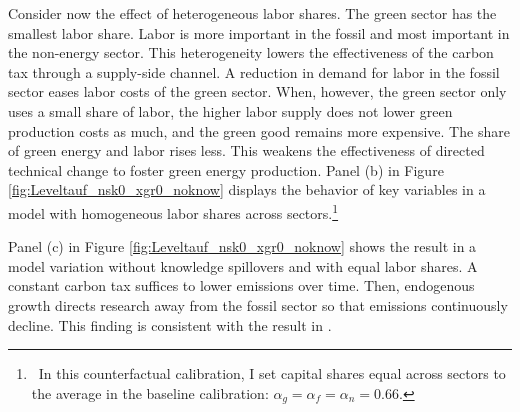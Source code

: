 Consider now the effect of heterogeneous labor shares. The green sector has the smallest labor share. Labor is more important in the fossil and most important in the non-energy sector. This heterogeneity lowers the effectiveness of the carbon tax through a supply-side channel. 
 A reduction in demand for labor in the fossil sector eases labor costs of the green sector. When, however, the green sector only uses a small share of labor, the higher labor supply does not lower green production costs as much, and the green good remains more expensive. The share of green energy and labor rises less. This weakens the effectiveness of directed technical change to foster green energy production. 
 Panel (b) in Figure \ref{fig:Leveltauf_nsk0_xgr0_noknow} displays the behavior of key variables in a model with homogeneous labor shares across sectors.\footnote{\ In this counterfactual calibration, I set capital shares equal across sectors to the average in the baseline calibration: $\alpha_g=\alpha_f=\alpha_n=0.66$. } 





Panel (c) in Figure \ref{fig:Leveltauf_nsk0_xgr0_noknow} shows the result in a model variation without knowledge spillovers and with equal labor shares. A constant carbon tax suffices to lower emissions over time. Then, endogenous growth directs research away from the fossil sector so that emissions continuously decline.  This finding is consistent with the result in \cite{Acemoglu2012TheChange}. %

